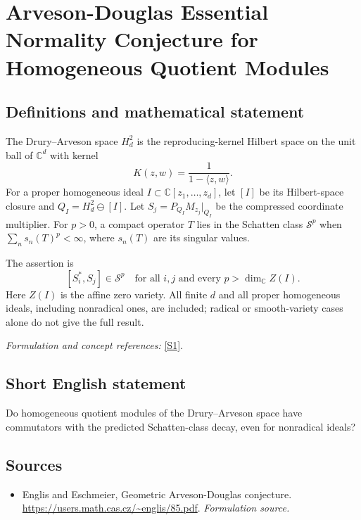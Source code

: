 \documentclass[11pt]{article}
\begin{document}
\section*{\texorpdfstring{Arveson-Douglas Essential Normality Conjecture for Homogeneous Quotient Modules}{Arveson-Douglas Essential Normality Conjecture for Homogeneous Quotient Modules}}\label{30006954}
\subsection{Definitions and mathematical statement}
The Drury--Arveson space $H_d^2$ is the reproducing-kernel Hilbert space on the unit ball of ${\mathbb{C}}^d$ with kernel
\[
 K(z,w)=\frac1{1-\langle z,w\rangle}.
\]
For a proper homogeneous ideal $I\subset{\mathbb{C}}[z_1,\ldots,z_d]$, let $[I]$ be its Hilbert-space closure and $Q_I=H_d^2\ominus[I]$. Let $S_j=P_{Q_I}M_{z_j}|_{Q_I}$ be the compressed coordinate multiplier. For $p>0$, a compact operator $T$ lies in the Schatten class $\mathcal S^p$ when $\sum_ns_n(T)^p<\infty$, where $s_n(T)$ are its singular values.

The assertion is
\[
 [S_i^*,S_j]\in\mathcal S^p
 \quad\text{for all }i,j\text{ and every }p>\dim_{{\mathbb{C}}} Z(I).
\]
Here $Z(I)$ is the affine zero variety. All finite $d$ and all proper homogeneous ideals, including nonradical ones, are included; radical or smooth-variety cases alone do not give the full result.
\par\smallskip\textit{Formulation and concept references:} \href{https://users.math.cas.cz/~englis/85.pdf}{[S1]}.

\subsection{Short English statement}
Do homogeneous quotient modules of the Drury--Arveson space have commutators with the predicted Schatten-class decay, even for nonradical ideals?
\subsection{Sources}
\begin{itemize}
\item[S1]Englis and Eschmeier, Geometric Arveson-Douglas conjecture.
\url{https://users.math.cas.cz/~englis/85.pdf}.
\textit{Formulation source.}
\end{itemize}
\end{document}

